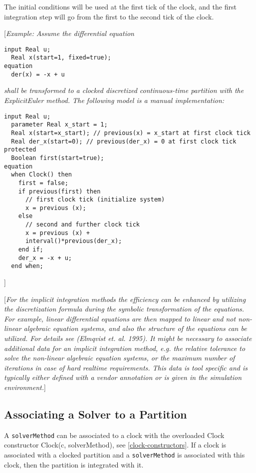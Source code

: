 The initial conditions will be used at the first tick of the clock, and
the first integration step will go from the first to the second tick of
the clock.

{[}\emph{Example:}
\emph{Assume the differential equation}
\begin{lstlisting}[language=modelica]
  input Real u;
  Real x(start=1, fixed=true);
equation
  der(x) = -x + u
\end{lstlisting}
\emph{shall be transformed to a clocked discretized continuous-time
partition with the ExplicitEuler method. The following model is a manual
implementation:}

\begin{lstlisting}[language=modelica]
  input Real u;
  parameter Real x_start = 1;
  Real x(start=x_start); // previous(x) = x_start at first clock tick
  Real der_x(start=0); // previous(der_x) = 0 at first clock tick
protected 
  Boolean first(start=true);
equation 
  when Clock() then
    first = false;
    if previous(first) then
      // first clock tick (initialize system)
      x = previous (x);
    else
      // second and further clock tick
      x = previous (x) +
      interval()*previous(der_x);
    end if;
    der_x = -x + u;
  end when;
\end{lstlisting}
{]}

{[}\emph{For the implicit integration methods the efficiency can be
enhanced by utilizing the discretization formula during the symbolic
transformation of the equations. For example, linear differential
equations are then mapped to linear and not non-linear algebraic
equation systems, and also the structure of the equations can be
utilized. For details see (Elmqvist et. al. 1995). It might be necessary
to associate additional data for an implicit integration method, e.g.
the relative tolerance to solve the non-linear algebraic equation
systems, or the maximum number of iterations in case of hard realtime
requirements. This data is tool specific and is typically either defined
with a vendor annotation or is given in the simulation environment.}{]}

\subsection{Associating a Solver to a Partition}

A \lstinline!solverMethod! can be associated to a clock with the overloaded Clock
constructor Clock(c, solverMethod), see \autoref{clock-constructors}. If a clock is
associated with a clocked partition and a \lstinline!solverMethod! is associated
with this clock, then the partition is integrated with it.

